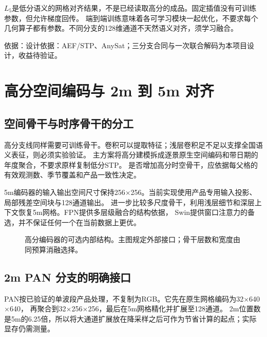 \documentclass[UTF8,fontset=fandol,zihao=5,a4paper]{ctexart}
\newcommand{\source}[1]{\par{\footnotesize\color{muted}依据：#1}\par}
\newcommand{\reportpage}{\clearpage}
\begin{document}
$L_5$是低分语义的网格对齐结果，不是已经读取高分的成品。固定插值没有可训练参数，但允许梯度回传。
端到端训练意味着各可学习模块一起优化，不要求每个几何算子都有参数。不同分支的128维通道不天然语义对齐，须学习融合。
\source{设计依据：AEF/STP\cite{aef}、AnySat\cite{anysat}；三分支合同与一次联合解码为本项目设计，收益待验证。}

\reportpage
\section{高分空间编码与 2m 到 5m 对齐}
\subsection{空间骨干与时序骨干的分工}
高分支线同样需要可训练骨干。卷积可以提取特征；浅层卷积足不足以支撑全国语义表征，则必须实验验证。
主方案将高分建模拆成逐景原生空间编码和带日期的年度聚合，不要求原样复制低分STP。
是否增加高分时空骨干，应依据每父格的有效观测数、季节覆盖和产品一致性决定。

5m编码器的输入输出空间尺寸保持256$\times$256。当前实现使用产品专用输入投影、局部残差空间块与128通道输出。
进一步比较多尺度骨干，利用浅层细节和深层上下文恢复5m网格。FPN提供多层级融合的结构依据，
Swin提供窗口注意力的备选，并不保证任何一个在当前数据上更优\cite{fpn,swin}。

\begin{figure}[h]
\centering
{}
\caption{高分编码器的可选内部结构。主图规定外部接口；骨干层数和宽度由同预算消融选择。}
\end{figure}

\subsection{2m PAN 分支的明确接口}
PAN按已验证的单波段产品处理，不复制为RGB。它先在原生网格编码为32$\times$640$\times$640，
再聚合到32$\times$256$\times$256，最后在5m网格精化并扩展至128通道。
2m位置数是5m的6.25倍，所以将大通道扩展放在降采样之后可作为节省计算的起点；实际显存仍需测量。
\end{document}
